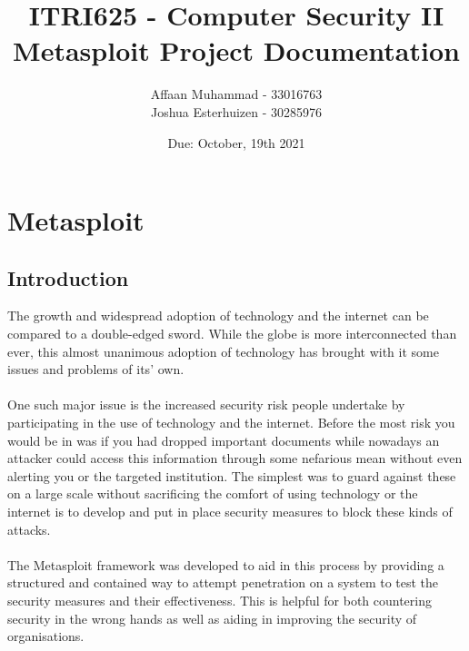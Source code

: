 \documentclass[a4paper, 12pt, titlepage]{report}
\begin{document}
\linespread{1.5}
\author{Affaan Muhammad - 33016763\\Joshua Esterhuizen - 30285976}
\title{ITRI625 - Computer Security II\\Metasploit Project Documentation}
\date{Due: October, 19th 2021}
\maketitle
\tableofcontents{}
\chapter{Metasploit}
\section{Introduction}
The growth and widespread adoption of technology and the internet can be compared to a double-edged sword. While the globe is more interconnected than ever, this almost unanimous adoption of technology has brought with it some issues and problems of its’ own. 
\\\\
One such major issue is the increased security risk people undertake by participating in the use of technology and the internet. Before the most risk you would be in was if you had dropped important documents while nowadays an attacker could access this information through some nefarious mean without even alerting you or the targeted institution. The simplest was to guard against these on a large scale without sacrificing the comfort of using technology or the internet is to develop and put in place security measures to block these kinds of attacks. 
\\\\
The Metasploit framework was developed to aid in this process by providing a structured and contained way to attempt penetration on a system to test the security measures and their effectiveness.  This is helpful for both countering security in the wrong hands as well as aiding in improving the security of organisations. 
\end{document}
